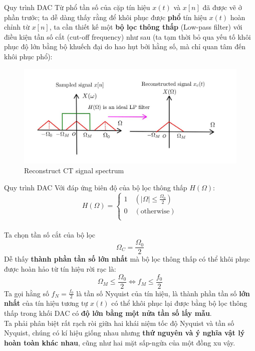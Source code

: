 \documentclass[8pt]{beamer}
\begin{document}
\begin{frame}{Quy trình DAC}
	Từ phổ tần số của cặp tín hiệu $x(t)$ và $x[n]$ đã được vẽ ở phần trước; ta dễ dàng thấy rằng để khôi phục được \textbf{phổ} tín hiệu $x(t)$ hoàn chỉnh từ $x[n]$, ta cần thiết kế một \textbf{bộ lọc thông thấp} (Low-pass filter) với điều kiện tần số cắt (cut-off frequency) như sau (ta tạm thời bỏ qua yếu tố khôi phục độ lớn bằng bộ khuếch đại do hao hụt bởi hằng số, mà chỉ quan tâm đến khôi phục phổ):
\begin{figure}[h]
			\includegraphics[width=1.1\textwidth]{8.jpg}
			\caption{Reconstruct CT signal spectrum}			\label{fig:re9}
		\end{figure}


\end{frame}
\begin{frame}{Quy trình DAC}
Với đáp ứng biên độ của bộ lọc thông thấp $H(\Omega)$:
\begin{equation*}
H(\Omega)=
\begin{cases}
	1\quad(|\Omega|\leq\frac{\Omega_{0}}{2})\\
	0\quad(\text{otherwise})\\
\end{cases}
\end{equation*}
\\ Ta chọn tần số cắt của bộ lọc $$\Omega_{C}=\frac{\Omega_{0}}{2}$$
Dễ thấy \textbf{thành phần tần số lớn nhất} mà bộ lọc thông thấp có thể khôi phục được hoàn hảo từ tín hiệu rời rạc là: $$\Omega_{M}\leq\frac{\Omega_{0}}{2}\Leftrightarrow f_{M}\leq\frac{f_{0}}{2}$$
Ta gọi hằng số $f_{N}=\frac{f_{0}}{2}$ là \alert{tần số Nyquist của tín hiệu}, là thành phần tần số \textbf{lớn nhất} của tín hiệu tương tự $x(t)$ có thể khôi phục lại được bằng bộ lọc thông thấp trong khối DAC có \textbf{độ lớn bằng một nửa tần số lấy mẫu}.
\\  Ta phải phân biệt rất rạch ròi giữa hai khái niệm \alert{tốc độ Nyquist} và \alert{tần số Nyquist}, chúng có kí hiệu giống nhau nhưng \textbf{thứ nguyên và ý nghĩa vật lý hoàn toàn khác nhau}, cũng như hai mặt sấp-ngửa của một đồng xu vậy.

\end{frame}
\end{document}
